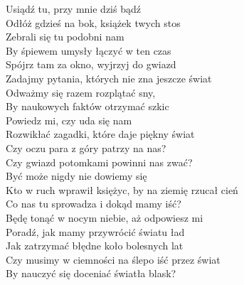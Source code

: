 \begin{flushleft}    
Usiądź tu, przy mnie dziś bądź\\
Odłóż gdzieś na bok, książek twych stos\\
Zebrali się tu podobni nam\\
By śpiewem umysły łączyć w ten czas\\
\hop
Spójrz tam za okno, wyjrzyj do gwiazd\\
Zadajmy pytania, których nie zna jeszcze świat\\
Odważmy się razem rozplątać sny, \\
By naukowych faktów otrzymać szkic\\
\hops
Powiedz mi, czy uda się nam\\
Rozwikłać zagadki, które daje piękny świat\\
Czy oczu para z góry patrzy na nas? \\
Czy gwiazd potomkami powinni nas zwać?\\
\hop
Być może nigdy nie dowiemy się \\
Kto w ruch wprawił księżyc, by na ziemię rzucał cień\\ 
Co nas tu sprowadza i dokąd mamy iść?\\
Będę tonąć w nocym niebie, aż odpowiesz mi\\
\hop
Poradź, jak mamy przywrócić światu ład\\
Jak zatrzymać błędne koło bolesnych lat\\
Czy musimy w ciemności na ślepo iść przez świat\\
By nauczyć się doceniać światła blask?\\
\end{flushleft}
